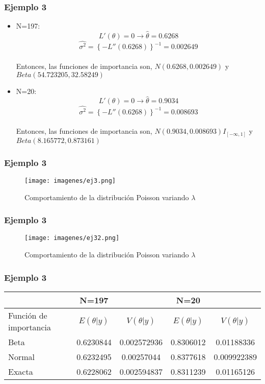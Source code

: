 \documentclass[12pt]{beamer}
\begin{document}
\begin{frame}
\frametitle{Ejemplo 3}
\begin{itemize}
\item N=197: $$L'(\theta)=0\rightarrow \hat{\theta}=0.6268$$
$$\hat{\sigma^2}=\left\lbrace -L''(0.6268) \right\rbrace ^{-1}=0.002649 $$
~\\Entonces, las funciones de importancia son, $N(0.6268,0.002649)$ y $Beta(54.723205,32.58249)$
\item N=20: $$L'(\theta)=0\rightarrow \hat{\theta}=0.9034$$
$$\hat{\sigma^2}=\left\lbrace -L''(0.6268) \right\rbrace ^{-1}=0.008693 $$
~\\Entonces, las funciones de importancia son, $N(0.9034,0.008693)I_{[-\infty,1]}$ y $Beta(8.165772,0.873161)$
\end{itemize}
\end{frame}

\begin{frame}
\frametitle{Ejemplo 3}
\begin{figure}[!h]
    \begin{center}
        \texttt{[image: imagenes/ej3.png]}
        \caption{Comportamiento de la distribución Poisson variando $\lambda$}
        \label{fig:Densidad}
    \end{center}
\end{figure}
\end{frame}

\begin{frame}
\frametitle{Ejemplo 3}
\begin{figure}[!h]
    \begin{center}
        \texttt{[image: imagenes/ej32.png]}
        \caption{Comportamiento de la distribución Poisson variando $\lambda$}
        \label{fig:Densidad}
    \end{center}
\end{figure}
\end{frame}

\begin{frame}
\frametitle{Ejemplo 3}
\center
\begin{tabular}{|p{2.2cm}|cc|cc|}
\hline 
 & N=197 &  & N=20 &  \\ 
\hline 
Función de importancia & $E(\theta|y)$ & $V(\theta|y)$ & $E(\theta|y)$ & $V(\theta|y)$ \\ 
\hline 
Beta &  0.6230844 & 0.002572936 & 0.8306012 & 0.01188336 \\ 
\hline 
Normal & 0.6232495 & 0.00257044 & 0.8377618 & 0.009922389 \\ 
\hline 
Exacta & 0.6228062 & 0.002594837 & 0.8311239 & 0.01165126 \\ 
\hline 
\end{tabular} 
\end{frame}
\end{document}
